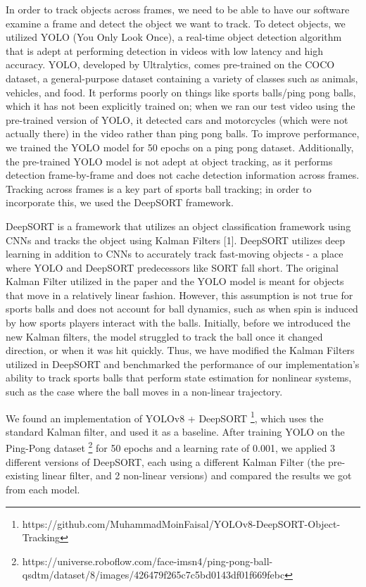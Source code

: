 \documentclass[10pt,twocolumn,letterpaper]{article}
\begin{document}
In order to track objects across frames, we need to be able to have our software examine a frame and detect the object we want to track.
To detect objects, we utilized YOLO (You Only Look Once), a real-time object detection algorithm that is adept at performing detection
in videos with low latency and high accuracy. YOLO, developed by Ultralytics, comes pre-trained on the COCO dataset, a general-purpose dataset containing 
a variety of classes such as animals, vehicles, and food. It performs poorly on things like sports balls/ping pong balls, which it has not been explicitly 
trained on; when we ran our test video using the pre-trained version of YOLO, it detected cars and motorcycles (which were not actually there) in the video 
rather than ping pong balls. To improve performance, we trained the YOLO model for 50 epochs on a ping pong dataset. Additionally, the pre-trained YOLO model 
is not adept at object tracking, as it performs detection frame-by-frame and does not cache detection information across frames. Tracking across frames is a 
key part of sports ball tracking; in order to incorporate this, we used the DeepSORT framework.

DeepSORT is a framework that utilizes an object classification framework using CNNs and tracks the object using Kalman Filters [1]. 
DeepSORT utilizes deep learning in addition to CNNs to accurately track fast-moving objects - a place where YOLO and DeepSORT predecessors like SORT fall 
short. The original Kalman Filter utilized in the paper and the YOLO model is meant for objects that move in a relatively linear fashion. However, 
this assumption is not true for sports balls and does not account for ball dynamics, such as when spin is induced by how sports players interact with the balls. 
Initially, before we introduced the new Kalman filters, the model struggled to track the ball once it changed direction, or when it was hit quickly. 
Thus, we have modified the Kalman Filters utilized in DeepSORT and benchmarked the performance of our implementation’s ability to track sports balls that 
perform state estimation for nonlinear systems, such as the case where the ball moves in a non-linear trajectory. 

We found an implementation of YOLOv8 + DeepSORT \footnote[1]{https://github.com/MuhammadMoinFaisal/YOLOv8-DeepSORT-Object-Tracking}, 
which uses the standard Kalman filter, and used it as a baseline. After training YOLO on the Ping-Pong dataset \footnote[2]{https://universe.roboflow.com/face-imsn4/ping-pong-ball-qsdtm/dataset/8/images/426479f265c7c5bd0143df01f669febc} for 50 epochs and a learning rate of 0.001,
we applied 3 different versions of DeepSORT, each using a different Kalman Filter (the pre-existing linear filter, and 2 non-linear versions) and compared the results we got from each model.
\end{document}
